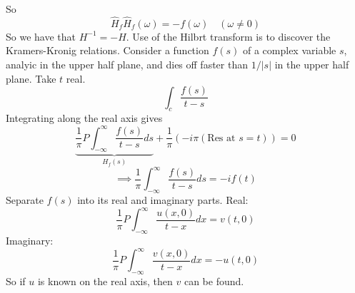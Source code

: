 \documentclass{article}
\newcommand{\improp}{\int_{-\infty}^{\infty} } %
\begin{document}
So
\[ \hat{H}_f\hat{H}_f (\omega) = -f(\omega) \quad (\omega \neq 0) \]
So we have that $H^{-1} = -H$.
Use of the Hilbrt transform is to discover the Kramers-Kronig relations.
Consider a function $f(s)$ of a complex variable $s$, analyic in the 
upper half plane, and dies off faster than $1/|s|$ in the upper half plane.
Take $t$ real. 
\[ \int_c \frac{f(s)}{t-s} \]
Integrating along the real axis gives
\[ \underbrace{\frac{1}{\pi} P\improp \frac{f(s)}{t-s} ds}_{H_f(s)}
+\frac{1}{\pi} (-i\pi(\mbox{Res at } s=t)) =0\]
\[ \implies \frac{1}{\pi} \improp \frac{f(s)}{t-s} ds = -i f(t) \]
Separate $f(s)$ into its real and imaginary parts.
Real:
\[ \frac{1}{\pi} P \improp \frac{u(x,0)}{t-x} dx = v(t,0)\]
Imaginary:
\[ \frac{1}{\pi} P \improp \frac{v(x,0)}{t-x} dx = -u(t,0)\]
So if $u$ is known on the real axis, then $v$ can be found.
\end{document}
